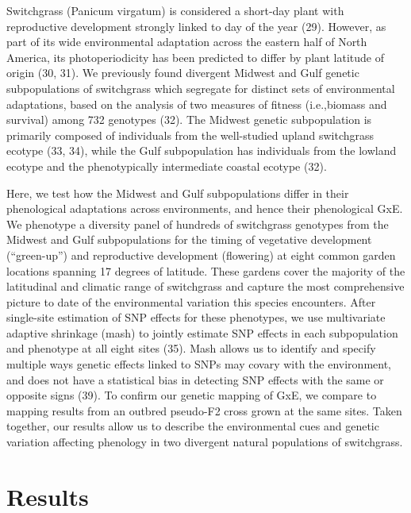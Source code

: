 \documentclass[
  9pt,
  twocolumn,
  twoside]{pnas-new}
\begin{document}
Switchgrass (Panicum virgatum) is considered a short-day plant with
reproductive development strongly linked to day of the year (29).
However, as part of its wide environmental adaptation across the eastern
half of North America, its photoperiodicity has been predicted to differ
by plant latitude of origin (30, 31). We previously found divergent
Midwest and Gulf genetic subpopulations of switchgrass which segregate
for distinct sets of environmental adaptations, based on the analysis of
two measures of fitness (i.e.,biomass and survival) among 732 genotypes
(32). The Midwest genetic subpopulation is primarily composed of
individuals from the well-studied upland switchgrass ecotype (33, 34),
while the Gulf subpopulation has individuals from the lowland ecotype
and the phenotypically intermediate coastal ecotype (32).

Here, we test how the Midwest and Gulf subpopulations differ in their
phenological adaptations across environments, and hence their
phenological GxE. We phenotype a diversity panel of hundreds of
switchgrass genotypes from the Midwest and Gulf subpopulations for the
timing of vegetative development (``green-up'') and reproductive
development (flowering) at eight common garden locations spanning 17
degrees of latitude. These gardens cover the majority of the latitudinal
and climatic range of switchgrass and capture the most comprehensive
picture to date of the environmental variation this species encounters.
After single-site estimation of SNP effects for these phenotypes, we use
multivariate adaptive shrinkage (mash) to jointly estimate SNP effects
in each subpopulation and phenotype at all eight sites (35). Mash allows
us to identify and specify multiple ways genetic effects linked to SNPs
may covary with the environment, and does not have a statistical bias in
detecting SNP effects with the same or opposite signs (39). To confirm
our genetic mapping of GxE, we compare to mapping results from an
outbred pseudo-F2 cross grown at the same sites. Taken together, our
results allow us to describe the environmental cues and genetic
variation affecting phenology in two divergent natural populations of
switchgrass.

\section{Results}\label{results}
\end{document}
